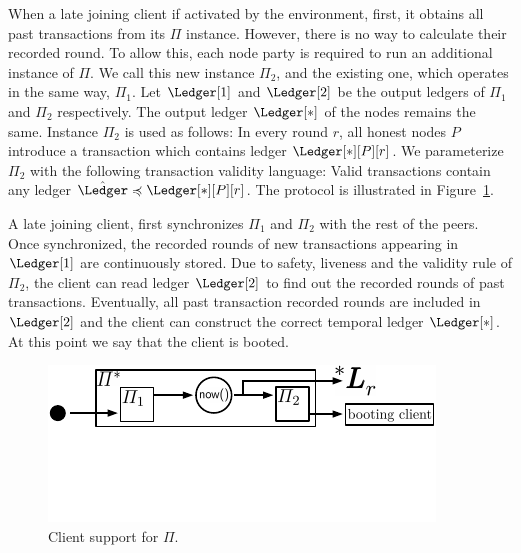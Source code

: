 When a late joining client if activated by the environment,
first, it obtains all past transactions from its $\Pi$ instance.
However, there is no way to calculate their recorded round.
To allow this, each node party is required to run an
additional instance of $\Pi$. We call this new instance $\Pi_2$,
and the existing one, which operates in the same way, $\Pi_1$.
Let $\Ledger[1]$ and $\Ledger[2]$ be the output ledgers
of $\Pi_1$ and $\Pi_2$ respectively.
The output ledger $\Ledger[*]$ of the nodes remains the same.
Instance $\Pi_2$ is used as follows:
In every round $r$, all honest nodes $P$ introduce a transaction
which contains ledger $\Ledger[*][P][r]$.
We parameterize $\Pi_2$ with the following transaction validity language:
Valid transactions contain any ledger $\hat \Ledger \preccurlyeq \Ledger[*][P][r]$.
The protocol is illustrated in Figure~\ref{fig:client-support}.

A late joining client, first synchronizes $\Pi_1$ and $\Pi_2$ with the rest
of the peers. Once synchronized, the recorded rounds of new
transactions appearing in $\Ledger[1]$ are continuously stored.
Due to safety, liveness and the validity rule of $\Pi_2$,
the client can read ledger $\Ledger[2]$ to find out the
recorded rounds of past transactions.
Eventually, all past transaction recorded rounds are included in $\Ledger[2]$
and the client can construct the correct temporal ledger $\Ledger[*]$.
At this point we say that the client is booted.

\begin{figure}
  \centering
  \includegraphics[width=0.7\columnwidth,keepaspectratio]{figures/clients.pdf}
  \caption{Client support for $\Pi$.
  }
 \label{fig:client-support}
\end{figure}